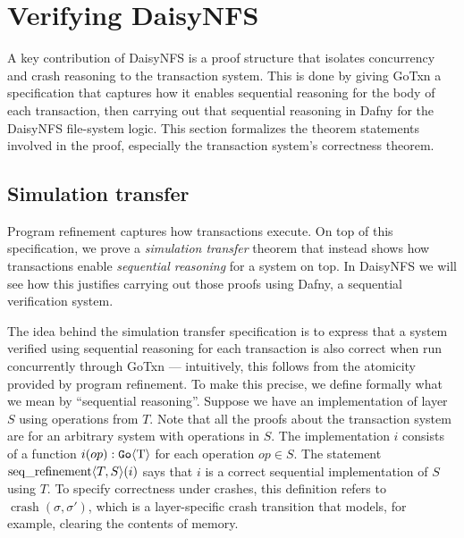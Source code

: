 \section{Verifying DaisyNFS}
\label{sec:daisy:proof}

A key contribution of DaisyNFS is a proof structure that isolates concurrency and crash
reasoning to the transaction system. This is done by giving GoTxn a specification
that captures how it enables sequential reasoning for the body of each
transaction, then carrying out that sequential reasoning in Dafny for the
DaisyNFS file-system logic. This section formalizes the theorem statements
involved in the proof, especially the transaction system's correctness theorem.

\subsection{Simulation transfer}

Program refinement captures how transactions execute. On top of this
specification, we prove a \emph{simulation transfer} theorem that instead shows
how transactions enable \emph{sequential reasoning} for a system on top. In
DaisyNFS we will see how this justifies carrying out those proofs using Dafny, a
sequential verification system.

The idea behind the simulation transfer specification is to express that a system
verified using sequential reasoning for each transaction is also correct when
run concurrently through GoTxn --- intuitively, this follows from the atomicity
provided by program refinement.
To make this precise, we define formally what we mean by
``sequential reasoning''. Suppose we have an
implementation of layer $S$ using operations from $T$. Note that all the proofs
about the transaction system are for an arbitrary system with operations in $S$. The implementation $i$
consists of a function $i(op) : \mathtt{Go}\langle \mathrm{T} \rangle$ for each operation $op \in S$. The statement
$\operatorname{seq\_refinement} \langle T, S \rangle(i)$ says that $i$ is a correct sequential
implementation of $S$ using $T$. To specify correctness under crashes, this
definition refers to $\operatorname{crash}(\sigma, \sigma')$, which is a
layer-specific crash transition that models, for example, clearing the
contents of memory.

